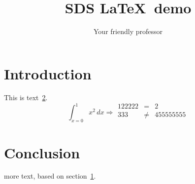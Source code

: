 \documentclass{article}
\begin{document}
\title{SDS \LaTeX\ demo}
\author{Your friendly professor}
\maketitle

\section{Introduction}
\label{sec:thefirst}

This is text~\ref{sec:thesecond}.
\[ \int_{x=0}^1 x^2\,dx
\Rightarrow
\begin{array}{rcl}
  122222 &= & 2 \\ 333 &\not=& 455555555 \\
\end{array}
\]
\section{Conclusion}
\label{sec:thesecond}

more text, based on section~\ref{sec:thefirst}.
\end{document}

